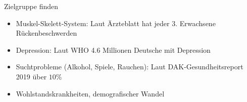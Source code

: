 \begin{frame}{Zielgruppe finden}
    \begin{itemize}
        \item Muskel-Skelett-System: Laut Ärzteblatt hat jeder 3. Erwachsene Rückenbeschwerden
        \item Depression: Laut WHO 4.6 Millionen Deutsche mit Depression
        \item Suchtprobleme (Alkohol, Spiele, Rauchen): Laut DAK-Gesundheitsreport 2019 über $10\%$
        \item Wohlstandskrankheiten, demografischer Wandel
    \end{itemize}
\end{frame}

